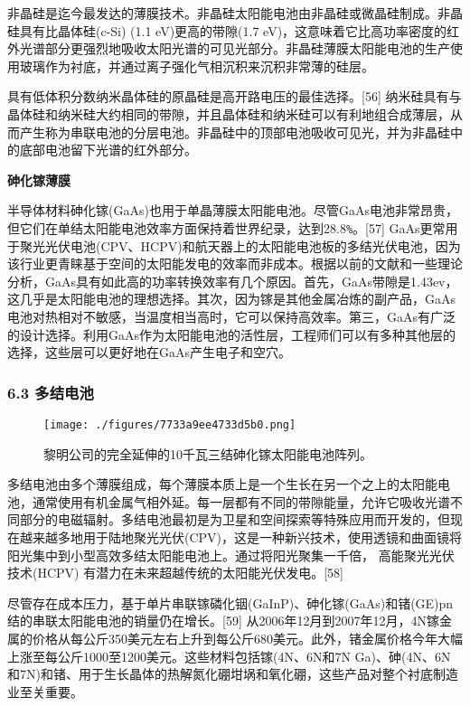 非晶硅是迄今最发达的薄膜技术。非晶硅太阳能电池由非晶硅或微晶硅制成。非晶硅具有比晶体硅(c-Si) (1.1 eV)更高的带隙(1.7 eV)，这意味着它比高功率密度的红外光谱部分更强烈地吸收太阳光谱的可见光部分。非晶硅薄膜太阳能电池的生产使用玻璃作为衬底，并通过离子强化气相沉积来沉积非常薄的硅层。

具有低体积分数纳米晶体硅的原晶硅是高开路电压的最佳选择。[56] 纳米硅具有与晶体硅和纳米硅大约相同的带隙，并且晶体硅和纳米硅可以有利地组合成薄层，从而产生称为串联电池的分层电池。非晶硅中的顶部电池吸收可见光，并为非晶硅中的底部电池留下光谱的红外部分。

\textbf{砷化镓薄膜}

半导体材料砷化镓(GaAs)也用于单晶薄膜太阳能电池。尽管GaAs电池非常昂贵，但它们在单结太阳能电池效率方面保持着世界纪录，达到28.8\verb|%|。[57] GaAs更常用于聚光光伏电池(CPV、HCPV)和航天器上的太阳能电池板的多结光伏电池，因为该行业更青睐基于空间的太阳能发电的效率而非成本。根据以前的文献和一些理论分析，GaAs具有如此高的功率转换效率有几个原因。首先，GaAs带隙是1.43ev，这几乎是太阳能电池的理想选择。其次，因为镓是其他金属冶炼的副产品，GaAs电池对热相对不敏感，当温度相当高时，它可以保持高效率。第三，GaAs有广泛的设计选择。利用GaAs作为太阳能电池的活性层，工程师们可以有多种其他层的选择，这些层可以更好地在GaAs产生电子和空穴。

\subsubsection{6.3 多结电池}

\begin{figure}[ht]
\centering
\texttt{[image: ./figures/7733a9ee4733d5b0.png]}
\caption{黎明公司的完全延伸的10千瓦三结砷化镓太阳能电池阵列。} \label{fig_TYNDC_6}
\end{figure}

多结电池由多个薄膜组成，每个薄膜本质上是一个生长在另一个之上的太阳能电池，通常使用有机金属气相外延。每一层都有不同的带隙能量，允许它吸收光谱不同部分的电磁辐射。多结电池最初是为卫星和空间探索等特殊应用而开发的，但现在越来越多地用于陆地聚光光伏(CPV)，这是一种新兴技术，使用透镜和曲面镜将阳光集中到小型高效多结太阳能电池上。通过将阳光聚集一千倍， 高能聚光光伏技术(HCPV) 有潜力在未来超越传统的太阳能光伏发电。[58]

尽管存在成本压力，基于单片串联镓磷化铟(GaInP)、砷化镓(GaAs)和锗(GE)pn结的串联太阳能电池的销量仍在增长。[59] 从2006年12月到2007年12月，4N镓金属的价格从每公斤350美元左右上升到每公斤680美元。此外，锗金属价格今年大幅上涨至每公斤1000至1200美元。这些材料包括镓(4N、6N和7N Ga)、砷(4N、6N和7N)和锗、用于生长晶体的热解氮化硼坩埚和氧化硼，这些产品对整个衬底制造业至关重要。

